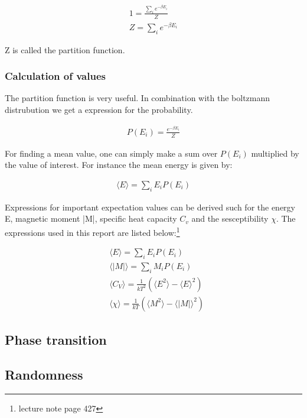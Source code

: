 \begin{align*}
	1 = \frac{\sum_{i} e^{-\beta E_i}}{Z}
	\\
	Z = \sum_{i} e^{-\beta E_i}
\end{align*}

Z is called the partition function. 

\subsubsection{Calculation of values}\label{sec:expect}

The partition function is very useful. In combination with the boltzmann distrubution we get a expression for the probability. 

\begin{align*}
	P(E_i) = \frac{e^{-\beta E_i}}{Z}
\end{align*}

For finding a mean value, one can simply make a sum over $P(E_i)$ multiplied by the value of interest. For instance the mean energy is given by: 

\begin{align*}
	\langle E \rangle = \sum_i E_i P(E_i)
\end{align*}

Expressions for important expectation values can be derived such for the energy E, magnetic moment |M|, specific heat capacity $C_v$ and the sesceptibility $\chi$. The expressions used in this report are listed below\cite{compphys}:\footnote{lecture note page 427}

\begin{align}
	&\langle E \rangle = \sum_i E_iP(E_i)
	\label{eq:E}
	\\
	&\langle |M| \rangle = \sum_i M_iP(E_i)
	\label{eq:M}
	\\
	&\langle C_V \rangle = \frac{1}{k T^2}
	\left(
	\langle E^2 \rangle - \langle E \rangle ^2
	\right)
	\label{eq:cv}
	\\
	&\langle \chi \rangle = \frac{1}{kT} 
	\left(
	\langle M^2 \rangle - \langle |M| \rangle ^2
	\right)
	\label{eq:chi}
\end{align}



\subsection{Phase transition}


\subsection{Randomness}













